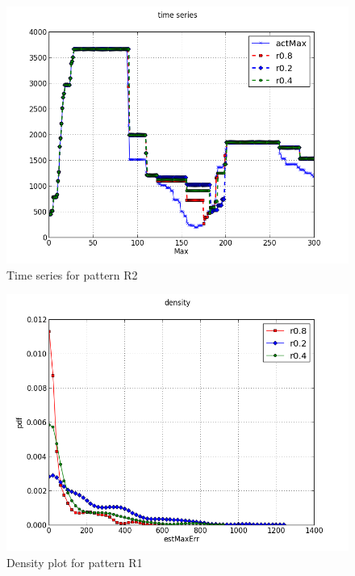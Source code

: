 \documentclass[a4paper, smallheadings,english]{scrartcl}
\begin{document}
\begin{figure}[h!]
    \begin{center}
        \includegraphics[scale=0.6]{plots/task1/time_series_R2}
    \end{center}
    \caption{Time series for pattern R2}
    \label{fig:task1_ts_r1}
\end{figure}
\begin{figure}[h!]
    \begin{center}
        \includegraphics[scale=0.6]{plots/task1/density_R1}
    \end{center}
    \caption{Density plot for pattern R1}
    \label{fig:task1_density_r1}
\end{figure}
\end{document}

